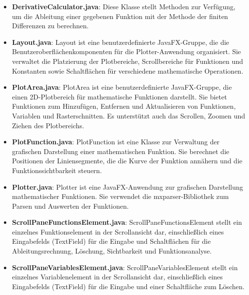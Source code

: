 \documentclass[a4paper]{article}
\begin{document}
\begin{itemize}
\item \textbf{DerivativeCalculator.java}: Diese Klasse stellt Methoden zur Verfügung, um die Ableitung einer gegebenen Funktion mit der Methode der finiten Differenzen zu berechnen.
\item \textbf{Layout.java}: Layout ist eine benutzerdefinierte JavaFX-Gruppe, die die Benutzeroberflächenkomponenten für die Plotter-Anwendung organisiert. Sie verwaltet die Platzierung der Plotbereiche, Scrollbereiche für Funktionen und Konstanten sowie Schaltflächen für verschiedene mathematische Operationen.
\item \textbf{PlotArea.java}: PlotArea ist eine benutzerdefinierte JavaFX-Gruppe, die einen 2D-Plotbereich für mathematische Funktionen darstellt. Sie bietet Funktionen zum Hinzufügen, Entfernen und Aktualisieren von Funktionen, Variablen und Rasterschnitten. Es unterstützt auch das Scrollen, Zoomen und Ziehen des Plotbereichs.
\item \textbf{PlotFunction.java}: PlotFunction ist eine Klasse zur Verwaltung der grafischen Darstellung einer mathematischen Funktion. Sie berechnet die Positionen der Liniensegmente, die die Kurve der Funktion annähern und die Funktionssichtbarkeit steuern.
\item \textbf{Plotter.java}: Plotter ist eine JavaFX-Anwendung zur grafischen Darstellung mathematischer Funktionen. Sie verwendet die mxparser-Bibliothek zum Parsen und Auswerten der Funktionen.
\item \textbf{ScrollPaneFunctionsElement.java}: ScrollPaneFunctionsElement stellt ein einzelnes Funktionselement in der Scrollansicht dar, einschließlich eines Eingabefelds (TextField) für die Eingabe und Schaltflächen für die Ableitungsrechnung, Löschung, Sichtbarkeit und Funktionsanalyse.
\item \textbf{ScrollPaneVariablesElement.java}: ScrollPaneVariablesElement stellt ein einzelnes Variablenelement in der Scrollansicht dar, einschließlich eines Eingabefelds (TextField) für die Eingabe und einer Schaltfläche zum Löschen.
\end{itemize}
\end{document}
